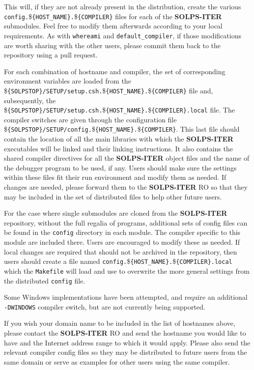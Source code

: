 \documentclass[a4paper,10pt]{report}
\newcommand\SOLPSITER{{\bf SOLPS-ITER} }
\begin{document}
This will, if they are not already present in the distribution, create the various {\tt config.}\${\tt \{HOST\_NAME\}.}\${\tt \{COMPILER\}} files for each of the \SOLPSITER submodules. Feel free to modify them afterwards according to your local requirements. As with {\tt whereami} and {\tt default\_compiler}, if those modifications are worth sharing with the other users, please commit them back to the repository using a pull request.

For each combination of hostname and compiler, the set of corresponding environment variables are loaded
from the \${\tt \{SOLPSTOP\}/\allowbreak SETUP/setup.csh.}\${\tt \{HOST\_NAME\}.}\${\tt \{COMPILER\}} file and, subsequently,
the \${\tt \{SOLPSTOP\}/\allowbreak SETUP/setup.csh.}\${\tt \{HOST\_NAME\}.\allowbreak}\${\tt \{COMPILER\}.local} file.
The compiler switches are given through the configuration file
\${\tt \{SOLPSTOP\}/SETUP/\allowbreak config.}\${\tt \{HOST\_NAME\}.}\${\tt \{COMPILER\}}. This last file should contain the
location of all the main libraries with which the \SOLPSITER executables will be linked and their
linking instructions. It also contains the shared compiler directives for all the \SOLPSITER object files
and the name of the debugger program to be used, if any.
Users should make sure the settings within these files fit their run environment and modify them as needed.
If changes are needed, please forward them to the \SOLPSITER RO so that they may be included in the
set of distributed files to help other future users.

For the case where single submodules are cloned from the \SOLPSITER repository, without the full regalia of
programs, additional sets of config files can be found in the {\tt config} directory in each module. The
compiler specific to this module are included there. Users are encouraged to modify these as needed. If local
changes are required that should not be archived in the repository, then users should create a file named
{\tt config.}\${\tt \{HOST\_NAME\}.}\${\tt \{COMPILER\}\allowbreak.local} which the {\tt Makefile} will load and use to
overwrite the more general settings from the distributed {\tt config} file.

Some Windows implementations have been attempted, and require an additional {\tt -DWINDOWS} compiler switch, but are not currently being supported.

If you wish your domain name to be included in the list of hostnames above, please contact the
\SOLPSITER RO and send the
hostname you would like to have and the Internet address range to which it would apply. Please
also send the relevant compiler config files so they may be distributed to future users from the
same domain or serve as examples for other users using the same compiler.
\end{document}
